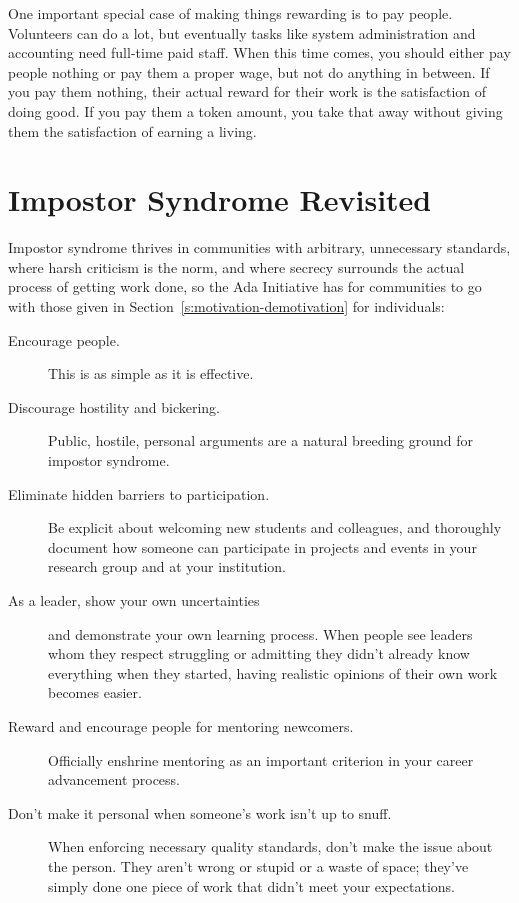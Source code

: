 One important special case of making things rewarding is to pay people.
Volunteers can do a lot, but eventually tasks like system administration
and accounting need full-time paid staff. When this time comes, you
should either pay people nothing or pay them a proper wage, but not do
anything in between. If you pay them nothing, their actual reward for
their work is the satisfaction of doing good. If you pay them a token
amount, you take that away without giving them the satisfaction of
earning a living.

\section{Impostor Syndrome Revisited}\label{s:community-impostor-syndrome}

Impostor syndrome thrives in communities with arbitrary, unnecessary
standards, where harsh criticism is the norm, and where secrecy
surrounds the actual process of getting work done, so the Ada
Initiative has  for communities to go with
those given in Section~\ref{s:motivation-demotivation} for individuals:

\begin{description}
\item[Encourage people.]
This is as simple as it is effective.
\item[Discourage hostility and bickering.]
Public, hostile, personal arguments are a natural breeding ground
for impostor syndrome.
\item[Eliminate hidden barriers to participation.]
Be explicit about welcoming new students and colleagues, and
thoroughly document how someone can participate in projects and
events in your research group and at your institution.
\item[As a leader, show your own uncertainties]
and demonstrate your own learning process. When people see leaders
whom they respect struggling or admitting they didn't already know
everything when they started, having realistic opinions of their own
work becomes easier.
\item[Reward and encourage people for mentoring newcomers.]
Officially enshrine mentoring as an important criterion in your
career advancement process.
\item[Don't make it personal when someone's work isn't up to snuff.]
When enforcing necessary quality standards, don't make the issue
about the person. They aren't wrong or stupid or a waste of space;
they've simply done one piece of work that didn't meet your
expectations.
\end{description}

